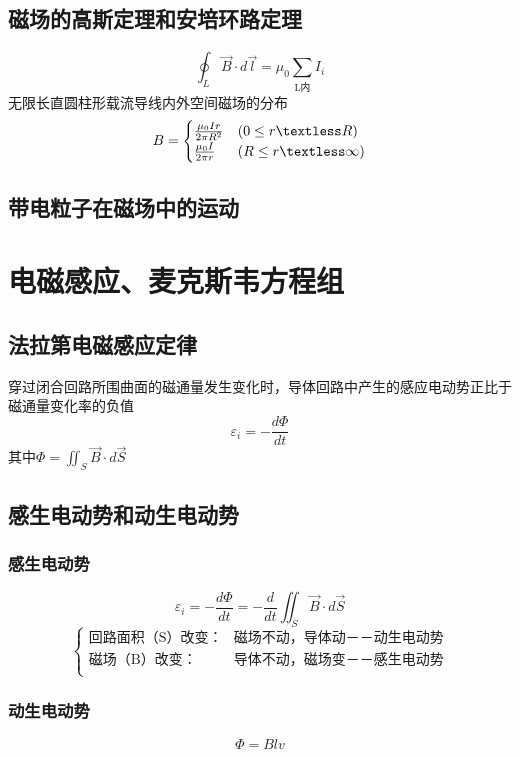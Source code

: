 \documentclass{article}
\begin{document}
    \subsection{磁场的高斯定理和安培环路定理}
    \[
        \oint_L \vec{B}\cdot d\vec{l}=\mu_0\sum\limits_\text{L内}I_i  
    \]
    无限长直圆柱形载流导线内外空间磁场的分布
    \begin{equation*}
        B=
        \begin{cases}
            \frac{\mu_0Ir}{2\pi R^2} & (0\leq r \textless R)\\
            \frac{\mu_0I}{2\pi r}&(R\leq r \textless \infty)
        \end{cases}
    \end{equation*}
    \subsection{带电粒子在磁场中的运动}
    \section{电磁感应、麦克斯韦方程组}
    \subsection{法拉第电磁感应定律}
    穿过闭合回路所围曲面的磁通量发生变化时，导体回路中产生的感应电动势正比于磁通量变化率的负值
    \[
        \varepsilon_i=-\frac{d\Phi}{dt}    
    \]
    其中$\Phi=\iint_S \vec{B}\cdot d\vec{S}$
    \subsection{感生电动势和动生电动势}
    \subsubsection{感生电动势}
    \[
        \varepsilon_i=-\frac{d\Phi}{dt}=-\frac{d}{dt}\iint_S \vec{B}\cdot d\vec{S}    
    \]
    \begin{equation*}
        \begin{cases}
            \text{回路面积（S）改变：}&\text{磁场不动，导体动－－动生电动势}\\
            \text{磁场（B）改变：}&\text{导体不动，磁场变－－感生电动势}\\
        \end{cases}
    \end{equation*}
    \subsubsection{动生电动势}
    \[
        \Phi=Blv
    \]
\end{document}
